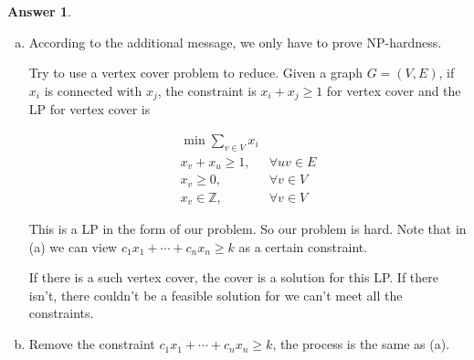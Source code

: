 \documentclass{article}
\theoremstyle{definition}
\newtheorem{ans}{Answer}
\begin{document}
	\begin{ans}
		~
		
		\begin{enumerate}[(a)]
			\item According to the additional message, we only have to prove NP-hardness. 
			
			Try to use a vertex cover problem to reduce. Given a graph $G=(V,E)$, if $x_i$ is connected with $x_j$, the constraint is $x_i+x_j\geq 1$ for vertex cover and the LP for vertex cover is 
			
			$$
			\begin{aligned}
				\min \sum_{v \in V} x_i & \\
				x_v+x_u \geq 1, & \forall u v \in E \\
				x_v \geq 0, & \forall v \in V \\
				x_v \in \mathbb{Z}, & \forall v \in V
			\end{aligned}
			$$
			
			This is a LP in the form of our problem. So our problem is hard. Note that in (a) we can view $c_{1} x_{1}+\cdots+c_{n} x_{n} \geq k$ as a certain constraint. 
			
			If there is a such vertex cover, the cover is a solution for this LP. If there isn't, there couldn't be a feasible solution for we can't meet all the constraints. 
			\item Remove the constraint $c_{1} x_{1}+\cdots+c_{n} x_{n} \geq k$, the process is the same as (a).
		\end{enumerate}
	\end{ans}
	
\end{document}
